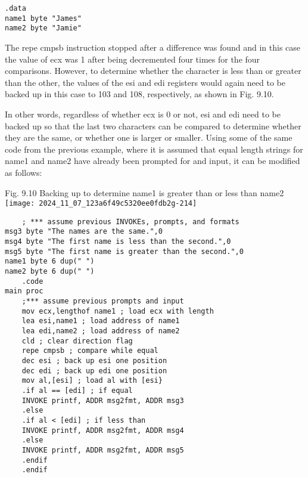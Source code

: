 \documentclass[10pt]{article}
\begin{document}
\begin{verbatim}
.data
name1 byte "James"
name2 byte "Jamie"
\end{verbatim}

The repe cmpsb instruction stopped after a difference was found and in this case the value of ecx was 1 after being decremented four times for the four comparisons. However, to determine whether the character is less than or greater than the other, the values of the esi and edi registers would again need to be backed up in this case to 103 and 108, respectively, as shown in Fig. 9.10.

In other words, regardless of whether ecx is 0 or not, esi and edi need to be backed up so that the last two characters can be compared to determine whether they are the same, or whether one is larger or smaller. Using some of the same code from the previous example, where it is assumed that equal length strings for name1 and name2 have already been prompted for and input, it can be modified as follows:

Fig. 9.10 Backing up to determine name1 is greater than or less than name2\\
\texttt{[image: 2024\_11\_07\_123a6f49c5320ee0fdb2g-214]}

\begin{verbatim}
    ; *** assume previous INVOKEs, prompts, and formats
msg3 byte "The names are the same.",0
msg4 byte "The first name is less than the second.",0
msg5 byte "The first name is greater than the second.",0
name1 byte 6 dup(" ")
name2 byte 6 dup(" ")
    .code
main proc
    ;*** assume previous prompts and input
    mov ecx,lengthof name1 ; load ecx with length
    lea esi,name1 ; load address of name1
    lea edi,name2 ; load address of name2
    cld ; clear direction flag
    repe cmpsb ; compare while equal
    dec esi ; back up esi one position
    dec edi ; back up edi one position
    mov al,[esi] ; load al with [esi}
    .if al == [edi] ; if equal
    INVOKE printf, ADDR msg2fmt, ADDR msg3
    .else
    .if al < [edi] ; if less than
    INVOKE printf, ADDR msg2fmt, ADDR msg4
    .else
    INVOKE printf, ADDR msg2fmt, ADDR msg5
    .endif
    .endif
\end{verbatim}
\end{document}
